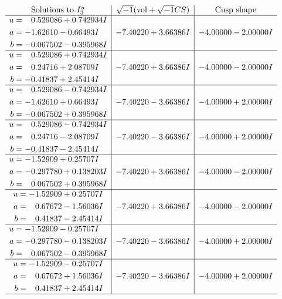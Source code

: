 \documentclass[1p]{elsarticle_modified}
\theoremstyle{definition}
\newcommand{\I}{\sqrt{-1}}
\begin{document}
$$\begin{array}{c|c|c}  
\text{Solutions to }I^u_{3}& \I (\text{vol} + \sqrt{-1}CS) & \text{Cusp shape}\\
 \hline 
\begin{aligned}
u &= \phantom{-}0.529086 + 0.742934 I \\
a &= -1.62610 - 0.66493 I \\
b &= -0.067502 - 0.395968 I\end{aligned}
 & -7.40220 + 3.66386 I & -4.00000 - 2.00000 I \\ \hline\begin{aligned}
u &= \phantom{-}0.529086 + 0.742934 I \\
a &= \phantom{-}0.24716 + 2.08709 I \\
b &= -0.41837 + 2.45414 I\end{aligned}
 & -7.40220 + 3.66386 I & -4.00000 - 2.00000 I \\ \hline\begin{aligned}
u &= \phantom{-}0.529086 - 0.742934 I \\
a &= -1.62610 + 0.66493 I \\
b &= -0.067502 + 0.395968 I\end{aligned}
 & -7.40220 - 3.66386 I & -4.00000 + 2.00000 I \\ \hline\begin{aligned}
u &= \phantom{-}0.529086 - 0.742934 I \\
a &= \phantom{-}0.24716 - 2.08709 I \\
b &= -0.41837 - 2.45414 I\end{aligned}
 & -7.40220 - 3.66386 I & -4.00000 + 2.00000 I \\ \hline\begin{aligned}
u &= -1.52909 + 0.25707 I \\
a &= -0.297780 + 0.138203 I \\
b &= \phantom{-}0.067502 + 0.395968 I\end{aligned}
 & -7.40220 + 3.66386 I & -4.00000 - 2.00000 I \\ \hline\begin{aligned}
u &= -1.52909 + 0.25707 I \\
a &= \phantom{-}0.67672 - 1.56036 I \\
b &= \phantom{-}0.41837 - 2.45414 I\end{aligned}
 & -7.40220 + 3.66386 I & -4.00000 - 2.00000 I \\ \hline\begin{aligned}
u &= -1.52909 - 0.25707 I \\
a &= -0.297780 - 0.138203 I \\
b &= \phantom{-}0.067502 - 0.395968 I\end{aligned}
 & -7.40220 - 3.66386 I & -4.00000 + 2.00000 I \\ \hline\begin{aligned}
u &= -1.52909 - 0.25707 I \\
a &= \phantom{-}0.67672 + 1.56036 I \\
b &= \phantom{-}0.41837 + 2.45414 I\end{aligned}
 & -7.40220 - 3.66386 I & -4.00000 + 2.00000 I\\
 \hline 
 \end{array}$$\newpage\newpage\renewcommand{\arraystretch}{1}
\end{document}
